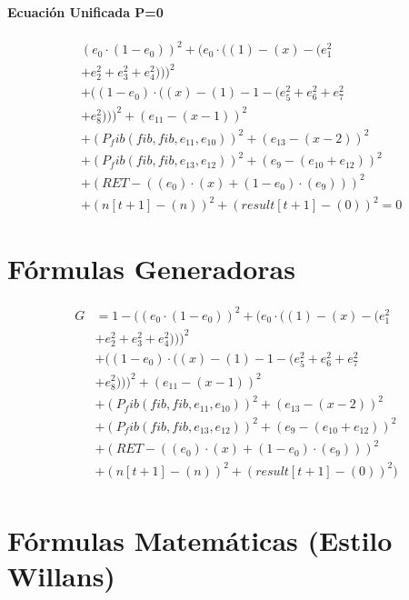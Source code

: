 \documentclass[10pt, a4paper]{article}
\begin{document}
\subsection*{Ecuación Unificada P=0}
\begin{align*}
& (e_{0}  \cdot  (1 - e_{0}))^{2} + (e_{0}  \cdot  ((1) - (x) - (e_{1}^{2} \\
& + e_{2}^{2} + e_{3}^{2} + e_{4}^{2})))^{2} \\
& + ((1 - e_{0})  \cdot  ((x) - (1) - 1 - (e_{5}^{2} + e_{6}^{2} + e_{7}^{2} \\
& + e_{8}^{2})))^{2} + (e_{11} - (x - 1))^{2} \\
& + (P_fib(fib, fib, e_{11}, e_{10}))^{2} + (e_{13} - (x - 2))^{2} \\
& + (P_fib(fib, fib, e_{13}, e_{12}))^{2} + (e_{9} - (e_{10} + e_{12}))^{2} \\
& + (RET - ((e_{0})  \cdot  (x) + (1 - e_{0})  \cdot  (e_{9})))^{2} \\
& + (n[t+1] - (n))^{2} + (result[t+1] - (0))^{2} = 0
\end{align*}\part{Fórmulas Generadoras}
\begin{small}
\begin{align*}
G &= 1 - ((e_{0}  \cdot  (1 - e_{0}))^{2} + (e_{0}  \cdot  ((1) - (x) - (e_{1}^{2} \\
& + e_{2}^{2} + e_{3}^{2} + e_{4}^{2})))^{2} \\
& + ((1 - e_{0})  \cdot  ((x) - (1) - 1 - (e_{5}^{2} + e_{6}^{2} + e_{7}^{2} \\
& + e_{8}^{2})))^{2} + (e_{11} - (x - 1))^{2} \\
& + (P_fib(fib, fib, e_{11}, e_{10}))^{2} + (e_{13} - (x - 2))^{2} \\
& + (P_fib(fib, fib, e_{13}, e_{12}))^{2} + (e_{9} - (e_{10} + e_{12}))^{2} \\
& + (RET - ((e_{0})  \cdot  (x) + (1 - e_{0})  \cdot  (e_{9})))^{2} \\
& + (n[t+1] - (n))^{2} + (result[t+1] - (0))^{2}) \\
\end{align*}
\end{small}\part{Fórmulas Matemáticas (Estilo Willans)}
\end{document}
